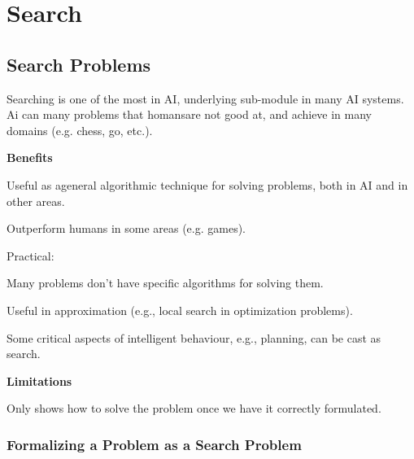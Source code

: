 \chapter{Search}

\section{Search Problems}

Searching is one of the most  in AI, underlying sub-module in many AI systems. Ai can  many problems that homansare not good at, and achieve  in many domains (e.g. chess, go, etc.).

\begin{listu}
    \item \textbf{Benefits}

    \begin{listu}
        \item Useful as ageneral algorithmic technique for solving problems, both in AI and in other areas.

        \item Outperform humans in some areas (e.g. games). 

        \item Practical:

        \begin{listu}
            \item Many problems don't have specific algorithms for solving them.
            \item Useful in approximation (e.g., local search in optimization problems).
        \end{listu}

        \item Some critical aspects of intelligent behaviour, e.g., planning, can be cast as search.
    \end{listu}
    
    \item \textbf{Limitations}
    
    \begin{listu}
        \item Only shows how to solve the problem once we have it correctly formulated.
    \end{listu}
\end{listu}


\subsection{Formalizing a Problem as a Search Problem}

